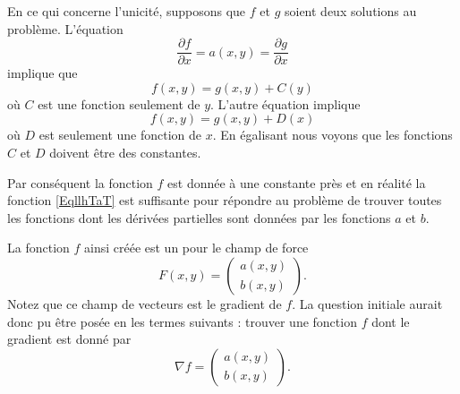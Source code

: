 En ce qui concerne l'unicité, supposons que \( f\) et \( g\) soient deux solutions au problème. L'équation
\begin{equation}
    \frac{ \partial f }{ \partial x }=a(x,y)=\frac{ \partial g }{ \partial x }
\end{equation}
implique que 
\begin{equation}
    f(x,y)=g(x,y)+C(y)
\end{equation}
où \( C\) est une fonction seulement de \( y\). L'autre équation implique
\begin{equation}
    f(x,y)=g(x,y)+D(x)
\end{equation}
où \( D\) est seulement une fonction de \( x\). En égalisant nous voyons que les fonctions \( C\) et \( D\) doivent être des constantes.

Par conséquent la fonction \( f\) est donnée à une constante près et en réalité la fonction \eqref{EqllhTaT} est suffisante pour répondre au problème de trouver toutes les fonctions dont les dérivées partielles sont données par les fonctions \( a\) et \( b\).

La fonction \( f\) ainsi créée est un  pour le champ de force
\begin{equation}
    F(x,y)=\begin{pmatrix}
        a(x,y)    \\ 
        b(x,y)  
    \end{pmatrix}.
\end{equation}
Notez que ce champ de vecteurs est le gradient de \( f\). La question initiale aurait donc pu être posée en les termes suivants : trouver une fonction \( f\) dont le gradient est donné par
\begin{equation}
    \nabla f=\begin{pmatrix}
        a(x,y)    \\ 
        b(x,y)    
    \end{pmatrix}.
\end{equation}
